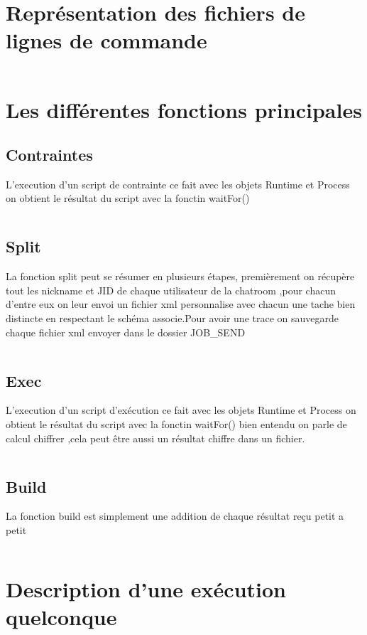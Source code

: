 \documentclass[11pt]{report}
\begin{document}
\inputminted{XML}{../Schema_XML/BDD_JOB.xsd}
\newpage 

\section{Représentation des fichiers de lignes de commande} 
\inputminted{bash}{../Echantillon_Script_Cmd/cmd.dc}
\newpage
\section{Les différentes fonctions principales}

\subsection{Contraintes} 
L'execution d'un script de contrainte ce fait avec les objets Runtime et Process on obtient le résultat du script avec la fonctin waitFor() 
\inputminted{perl}{../Echantillon_Script_Perl/DitributionContraintes.pl}
\subsection{Split} 
La fonction split peut se résumer en plusieurs étapes, premièrement on récupère tout les nickname et JID de chaque utilisateur de la chatroom ,pour chacun d'entre eux on leur envoi un fichier xml personnalise avec chacun une tache bien distincte en respectant le schéma associe.Pour avoir une trace on sauvegarde chaque fichier xml envoyer dans le dossier JOB\_SEND
\inputminted[tabsize=2,frame=lines,linenos]{java}{Fichier_import/split.java}
\subsection{Exec} 
L'execution d'un script d’exécution ce fait avec les objets Runtime et Process on obtient le résultat du script avec la fonctin waitFor() bien entendu on parle de calcul chiffrer ,cela peut être aussi un résultat chiffre dans un fichier. 
\inputminted[tabsize=2,frame=lines,linenos]{Perl}{Fichier_import/calcul.pl}
\subsection{Build} 
La fonction build est simplement une addition de chaque résultat reçu petit a petit 
\inputminted[tabsize=2,frame=lines,linenos]{Perl}{Fichier_import/build.java}
\newpage
\section{Description d'une exécution quelconque} 
\end{document}
